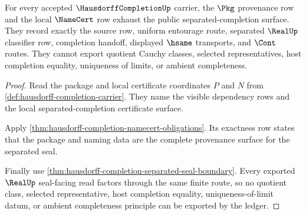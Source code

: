 \begin{theorem}
\label{thm:hausdorff-completion-ledger-exactness}
For every accepted $\HausdorffCompletionUp$ carrier, the $\Pkg$ provenance row and the local $\NameCert$ row exhaust the public separated-completion surface. They record exactly the source row, uniform entourage route, separated $\RealUp$ classifier row, completion handoff, displayed $\hsame$ transports, and $\Cont$ routes. They cannot export quotient Cauchy classes, selected representatives, host completion equality, uniqueness of limits, or ambient completeness.
\end{theorem}
\begin{proof}
Read the package and local certificate coordinates $P$ and $N$ from \autoref{def:hausdorff-completion-carrier}. They name the visible dependency rows and the local separated-completion certificate surface.

Apply \autoref{thm:hausdorff-completion-namecert-obligations}. Its exactness row states that the package and naming data are the complete provenance surface for the separated seal.

Finally use \autoref{thm:hausdorff-completion-separated-seal-boundary}. Every exported $\RealUp$ seal-facing read factors through the same finite route, so no quotient class, selected representative, host completion equality, uniqueness-of-limit datum, or ambient completeness principle can be exported by the ledger.
\end{proof}

